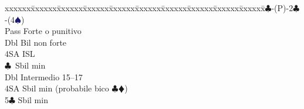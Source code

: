 \documentclass[a4paper,italian]{article}
\newcommand{\BC}{\textcolor{OliveGreen}{$\clubsuit$}}
\newcommand{\BD}{\textcolor{RedOrange}{$\vardiamondsuit$}}
\newcommand{\BS}{\textcolor{MidnightBlue}{$\spadesuit${}}}
\newenvironment{bidtable}
{\begin{tabbing}

    xxxxxx\=xxxxxx\=xxxxxx\=xxxxxx\=xxxxxx\=xxxxxx\=xxxxxx\=xxxxxx\=xxxxxx\=xxxxxx\=\kill}
{\end{tabbing} }%
\newenvironment{attenzione}[1]
{\begin{tcolorbox}[colframe=red!80!white,title=#1]}
    {
\end{tcolorbox} }%
\begin{document}
\begin{attenzione}{Interferenze}
                                    \bigbreak
                                    \begin{bidtable}
                                        1\BC-(P)-2\BC-(4\BS)\+\\
                                        Pass \> Forte o punitivo\\
                                        \>Dbl Bil non forte\\
                                        \>4SA ISL\\
                                        \BC\ Sbil min\\
                                        Dbl \> Intermedio 15--17\\
                                        4SA \> Sbil min (probabile bico \BC \BD )\\
                                        5\BC \> Sbil min\-
                                    \end{bidtable}
                                \end{attenzione}
\end{document}
